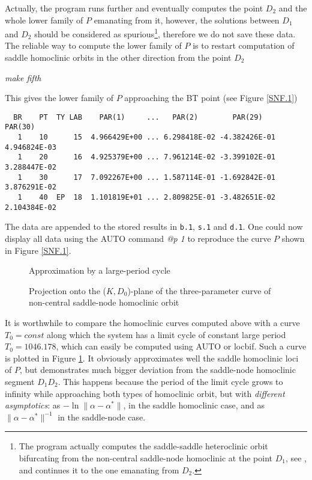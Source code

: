 \documentclass[12pt]{report}
\begin{document}
Actually, the program runs further and
eventually computes the point $D_2$ and the whole lower family of $P$
emanating from it, however, the solutions between $D_1$ and $D_2$
should be considered as spurious\footnote{\label{ft1} The program actually
computes the saddle-saddle heteroclinic orbit bifurcating from the
non-central saddle-node homoclinic at the point $D_1$, see
, and continues it to the one emanating from
$D_2$.}, therefore we do not save these data.
The reliable way to compute the lower family of $P$ is to restart computation
of saddle homoclinic orbits in the other direction from the point $D_2$
\begin{center}
{\it make fifth}
\end{center}
This gives the lower family of $P$ approaching the BT point
(see Figure \ref{SNF.1})
\begin{verbatim}
  BR    PT  TY LAB    PAR(1)     ...   PAR(2)        PAR(29)       PAR(30)    
   1    10      15  4.966429E+00 ... 6.298418E-02 -4.382426E-01  4.946824E-03
   1    20      16  4.925379E+00 ... 7.961214E-02 -3.399102E-01  3.288447E-02
   1    30      17  7.092267E+00 ... 1.587114E-01 -1.692842E-01  3.876291E-02
   1    40  EP  18  1.101819E+01 ... 2.809825E-01 -3.482651E-02  2.104384E-02
\end{verbatim}
The data are appended to the stored results in {\tt b.1}, {\tt s.1} and
{\tt d.1}. One could now display all data using the {\cal AUTO}
command {\it @p 1} to reproduce the curve $P$ shown in Figure
\ref{SNF.1}.
\par
\begin{figure}[p]
\epsfysize 10.0cm
\centerline{}
\caption{Approximation by a large-period cycle}
\label{SNF.2}
\end{figure}
\begin{figure}[p]
\epsfysize 9.0cm
\centerline{}
\caption{Projection onto the ($K,D_0$)-plane of the 
three-parameter curve of non-central  saddle-node homoclinic orbit}
\label{SNF.3}
\end{figure}
%
It is worthwhile to compare the homoclinic curves computed above with
a curve $T_0=const$ along which the system has a limit cycle of constant large
period $T_0=1046.178$, which can easily be computed using {\cal AUTO} or
{\cal locbif}. Such a curve is plotted in Figure \ref{SNF.2}. 
It obviously approximates well the saddle homoclinic loci of $P$, but 
demonstrates much bigger
deviation from the saddle-node homoclinic segment $D_1D_2$. This happens
because the period of the limit cycle grows to infinity while approaching both
types of homoclinic orbit, but with {\it different asymptotics}: 
as $-\ln\|\alpha-\alpha^*\|$, in the saddle homoclinic case, and 
as $\|\alpha-\alpha^*\|^{-1}$ in the saddle-node case. 
\end{document}
